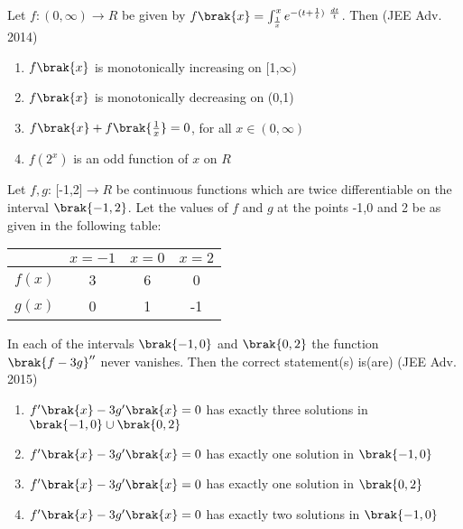     \item{
        
            Let $f: (0,\infty)\rightarrow R$ be given by $f\brak{x} = \int_{\frac{1}{x}}^x e^{-(t + \frac{1}{t})\ \frac{dt}{t}}$. Then
             \hfill
                {(JEE Adv. 2014)}
            \begin{multicols}{2}
                \begin{enumerate}
                    \item $f\brak{x}$ is monotonically increasing on [1,$\infty$)
                    \item $f\brak{x}$ is monotonically decreasing on (0,1)
                    \item $f\brak{x} + f\brak{\frac{1}{x}} = 0$, for all $x \in (0,\infty)$
                    \item $f(2^x)$ is an odd function of $x$ on $R$ 
                \end{enumerate}
            \end{multicols}
        
        }
    \item{
        
            Let $f,g$: [-1,2]$\rightarrow R$ be continuous functions which are twice differentiable on the interval $\brak{-1,2}$. Let the values of $f$ and $g$ at the points -1,0 and 2 be as given in the following table:
	\begin{center}
	    \begin{tabular}{|c|c|c|c|} 
		\hline
		       & $x=-1$ & $x = 0$ & $x = 2$ \\ 
		\hline
		$f(x)$ & 3      & 6       & 0       \\ 
		\hline
		$g(x)$ & 0      & 1       & -1       \\ 
		\hline
	    \end{tabular}
	\end{center}  
            In each of the intervals $\brak{-1,0}$ and $\brak{0,2}$ the function $\brak{f-3g}''$ never vanishes. Then the correct statement(s) is(are)
             \hfill
                {(JEE Adv. 2015)}
            
            \begin{enumerate}
                \item $f^{\prime}\brak{x} - 3g^{\prime}\brak{x} = 0$ has exactly three solutions in $\brak{-1,0}\cup\brak{0,2}$
                \item $f^{\prime}\brak{x} - 3g^{\prime}\brak{x} = 0$ has exactly one solution in $\brak{-1,0}$
                \item $f^{\prime}\brak{x} - 3g^{\prime}\brak{x} = 0$ has exactly one solution in $\brak{0,2}$
                \item $f^{\prime}\brak{x} - 3g^{\prime}\brak{x} = 0$ has exactly two solutions in $\brak{-1,0}$
            \end{enumerate}
        
        }
